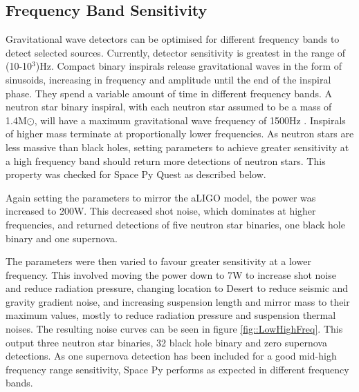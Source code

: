 \documentclass{article}
\begin{document}
\subsection{Frequency Band Sensitivity}
\label{sec::fband}
Gravitational wave detectors can be optimised for different frequency
bands to detect selected sources. Currently, detector sensitivity is
greatest in the range of (10-10$^3$)Hz. Compact binary inspirals
release gravitational waves in the form of sinusoids, increasing in
frequency and amplitude until the end of the inspiral phase. They
spend a variable amount of time in different frequency bands. A
neutron star binary inspiral, with each neutron star assumed to be a
mass of 1.4M$\odot$, will have a maximum gravitational wave frequency
of 1500Hz \cite{LIGO}. Inspirals of higher mass terminate at
proportionally lower frequencies. As neutron stars are less massive
than black holes, setting parameters to achieve greater sensitivity at
a high frequency band should return more detections of neutron
stars. This property was checked for Space Py Quest as described
below. 

Again setting the parameters to mirror the aLIGO model, the power was
increased to 200W. This decreased shot noise, which dominates at
higher frequencies, and returned detections of five neutron star
binaries, one black hole binary and one supernova. 

The parameters were then varied to favour greater sensitivity at a
lower frequency. This involved moving the power down to 7W to increase
shot noise and reduce radiation pressure, changing location to Desert
to reduce seismic and gravity gradient noise, and increasing
suspension length and mirror mass to their maximum values, mostly to
reduce radiation pressure and suspension thermal noises. The resulting
noise curves can be seen in figure \ref{fig::LowHighFreq}. This output
three neutron star binaries, 32 black hole binary and zero supernova
detections. As one supernova detection has been included for a good
mid-high frequency range sensitivity, Space Py performs as expected in
different frequency bands. 
\end{document}
